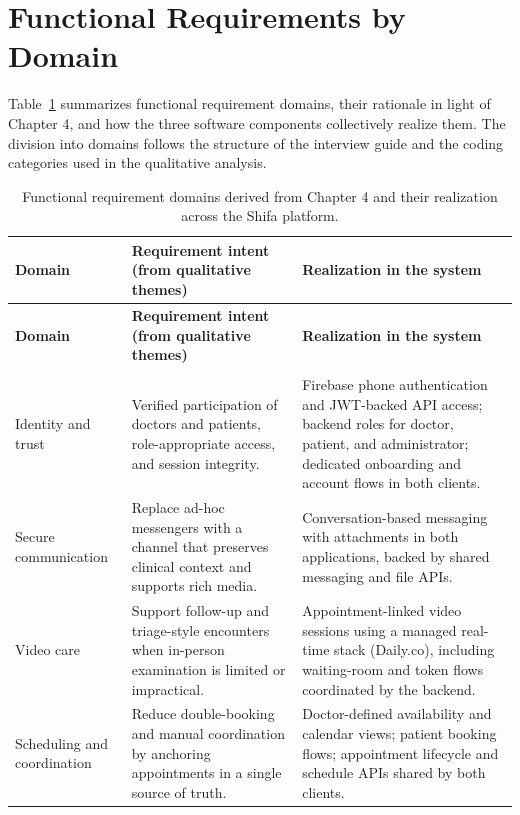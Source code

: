 \section{Functional Requirements by Domain}

Table~\ref{tab:functional-requirements-domains} summarizes functional requirement domains, their rationale in light of Chapter 4, and how the three software components collectively realize them. The division into domains follows the structure of the interview guide and the coding categories used in the qualitative analysis.

\footnotesize
\begin{longtable}{@{}>{\RaggedRight\arraybackslash}p{2.4cm}>{\RaggedRight\arraybackslash}p{4.8cm}>{\RaggedRight\arraybackslash}p{5.6cm}@{}}
\caption{Functional requirement domains derived from Chapter 4 and their realization across the Shifa platform.}\label{tab:functional-requirements-domains}\\
\toprule
\textbf{Domain} & \textbf{Requirement intent (from qualitative themes)} & \textbf{Realization in the system}\\\midrule
\endfirsthead
\toprule
\textbf{Domain} & \textbf{Requirement intent (from qualitative themes)} & \textbf{Realization in the system}\\\midrule
\endhead
\midrule
\multicolumn{3}{r@{}}{Continued on next page}\\\endfoot
\bottomrule
\endlastfoot
Identity and trust & Verified participation of doctors and patients, role-appropriate access, and session integrity. & Firebase phone authentication and JWT-backed API access; backend roles for doctor, patient, and administrator; dedicated onboarding and account flows in both clients.\\
Secure communication & Replace ad-hoc messengers with a channel that preserves clinical context and supports rich media. & Conversation-based messaging with attachments in both applications, backed by shared messaging and file APIs.\\
Video care & Support follow-up and triage-style encounters when in-person examination is limited or impractical. & Appointment-linked video sessions using a managed real-time stack (Daily.co), including waiting-room and token flows coordinated by the backend.\\
Scheduling and coordination & Reduce double-booking and manual coordination by anchoring appointments in a single source of truth. & Doctor-defined availability and calendar views; patient booking flows; appointment lifecycle and schedule APIs shared by both clients.\\

\end{longtable}
